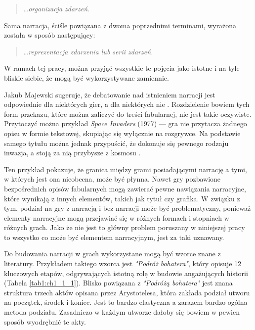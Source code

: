 \begin{quotation}
	\ldots \textit{organizacja zdarzeń.} \cite{narrative_structures}
\end{quotation}

Sama narracja, ściśle powiązana z dwoma poprzednimi terminami, wyrażona została w sposób
następujący:

\begin{quotation}
	\ldots \textit{reprezentacja zdarzenia lub serii zdarzeń.} \cite{narrative_structures}
\end{quotation}

W ramach tej pracy, można przyjąć wszystkie te pojęcia jako istotne i na tyle bliskie
siebie, że mogą być wykorzystywane zamiennie.

Jakub Majewski sugeruje, że debatowanie nad istnieniem narracji jest odpowiednie dla niektórych
gier, a dla niektórych nie \cite{theorising_narrative}. Rozdzielenie bowiem tych form
przekazu, które można zaliczyć do treści fabularnej, nie jest takie oczywiste. Przytoczyć można
przykład \textit{Space Invaders} (1977) --- gra nie przytacza żadnego opisu w formie tekstowej,
skupiając się wyłącznie na rozgrywce. Na podstawie samego tytułu można jednak
przypuścić, że dokonuje się pewnego rodzaju inwazja, a stoją za nią przybysze z kosmosu \cite{theorising_narrative}.

Ten przykład pokazuje, że granica między grami posiadającymi narrację a tymi, w których jest ona nieobecna,
może być płynna. Nawet gry pozbawione bezpośrednich opisów fabularnych mogą zawierać pewne nawiązania narracyjne,
które wynikają z innych elementów, takich jak tytuł czy grafika. W związku z tym, podział na gry z narracją i bez
narracji może być problematyczny, ponieważ elementy narracyjne mogą przejawiać się w różnych formach i stopniach
w różnych grach. Jako że nie jest to główny problem poruszany w niniejszej pracy to wszystko co może być elementem
narracyjnym, jest za taki uznawany.

Do budowania narracji w grach wykorzystane mogą być wzorce znane z literatury. Przykładem takiego wzorca jest
\textit{"Podróż bohatera"}\cite{narrative_structures}, który opisuje 12 kluczowych etapów, odgrywających
istotną rolę w budowie angażujących historii (Tabela \ref{tab1:ch1_1_1}). Blisko powiązana z \textit{"Podróżą bohatera"}
jest znana struktura trzech aktów opisana przez Arystotelesa, która zakłada podział utworu na
początek, środek i koniec\cite{narrative_structures}. Jest to bardzo elastyczna a zarazem bardzo ogólna metoda
podziału. Zasadniczo w każdym utworze dałoby się bowiem w pewien sposób wyodrębnić te akty.

